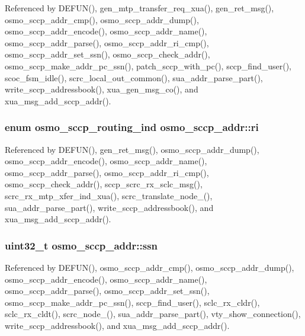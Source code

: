 Referenced by D\+E\+F\+U\+N(), gen\+\_\+mtp\+\_\+transfer\+\_\+req\+\_\+xua(), gen\+\_\+ret\+\_\+msg(), osmo\+\_\+sccp\+\_\+addr\+\_\+cmp(), osmo\+\_\+sccp\+\_\+addr\+\_\+dump(), osmo\+\_\+sccp\+\_\+addr\+\_\+encode(), osmo\+\_\+sccp\+\_\+addr\+\_\+name(), osmo\+\_\+sccp\+\_\+addr\+\_\+parse(), osmo\+\_\+sccp\+\_\+addr\+\_\+ri\+\_\+cmp(), osmo\+\_\+sccp\+\_\+addr\+\_\+set\+\_\+ssn(), osmo\+\_\+sccp\+\_\+check\+\_\+addr(), osmo\+\_\+sccp\+\_\+make\+\_\+addr\+\_\+pc\+\_\+ssn(), patch\+\_\+sccp\+\_\+with\+\_\+pc(), sccp\+\_\+find\+\_\+user(), scoc\+\_\+fsm\+\_\+idle(), scrc\+\_\+local\+\_\+out\+\_\+common(), sua\+\_\+addr\+\_\+parse\+\_\+part(), write\+\_\+sccp\+\_\+addressbook(), xua\+\_\+gen\+\_\+msg\+\_\+co(), and xua\+\_\+msg\+\_\+add\+\_\+sccp\+\_\+addr().

\subsubsection[{ri}]{\setlength{\rightskip}{0pt plus 5cm}enum {\bf osmo\+\_\+sccp\+\_\+routing\+\_\+ind} osmo\+\_\+sccp\+\_\+addr\+::ri}\label{structosmo__sccp__addr_a8847f7f8d8318cfa70db65670edb6182}


Referenced by D\+E\+F\+U\+N(), gen\+\_\+ret\+\_\+msg(), osmo\+\_\+sccp\+\_\+addr\+\_\+dump(), osmo\+\_\+sccp\+\_\+addr\+\_\+encode(), osmo\+\_\+sccp\+\_\+addr\+\_\+name(), osmo\+\_\+sccp\+\_\+addr\+\_\+parse(), osmo\+\_\+sccp\+\_\+addr\+\_\+ri\+\_\+cmp(), osmo\+\_\+sccp\+\_\+check\+\_\+addr(), sccp\+\_\+scrc\+\_\+rx\+\_\+sclc\+\_\+msg(), scrc\+\_\+rx\+\_\+mtp\+\_\+xfer\+\_\+ind\+\_\+xua(), scrc\+\_\+translate\+\_\+node\+\_(), sua\+\_\+addr\+\_\+parse\+\_\+part(), write\+\_\+sccp\+\_\+addressbook(), and xua\+\_\+msg\+\_\+add\+\_\+sccp\+\_\+addr().

\subsubsection[{ssn}]{\setlength{\rightskip}{0pt plus 5cm}uint32\+\_\+t osmo\+\_\+sccp\+\_\+addr\+::ssn}\label{structosmo__sccp__addr_a7862f57faa882bb3e69cc88fdacb98a0}


Referenced by D\+E\+F\+U\+N(), osmo\+\_\+sccp\+\_\+addr\+\_\+cmp(), osmo\+\_\+sccp\+\_\+addr\+\_\+dump(), osmo\+\_\+sccp\+\_\+addr\+\_\+encode(), osmo\+\_\+sccp\+\_\+addr\+\_\+name(), osmo\+\_\+sccp\+\_\+addr\+\_\+parse(), osmo\+\_\+sccp\+\_\+addr\+\_\+set\+\_\+ssn(), osmo\+\_\+sccp\+\_\+make\+\_\+addr\+\_\+pc\+\_\+ssn(), sccp\+\_\+find\+\_\+user(), sclc\+\_\+rx\+\_\+cldr(), sclc\+\_\+rx\+\_\+cldt(), scrc\+\_\+node\+\_(), sua\+\_\+addr\+\_\+parse\+\_\+part(), vty\+\_\+show\+\_\+connection(), write\+\_\+sccp\+\_\+addressbook(), and xua\+\_\+msg\+\_\+add\+\_\+sccp\+\_\+addr().

